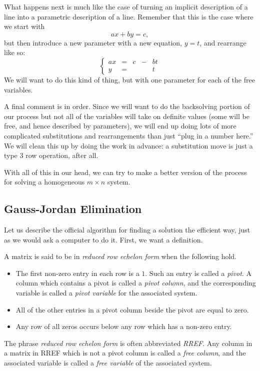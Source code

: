 \documentclass[elementsmain.tex]{subfiles}
\begin{document}
What happens next is much like the case of turning an implicit description of a line into a parametric description of a line. Remember that this is the case where we start with 
\[
ax+by=c,
\]
but then introduce a new parameter with a new equation, $y=t$, and rearrange like so:
\[
\left\{\begin{array}{rrrrr}
a x & = & c & - & b t \\
  y & = &   &   &   t
\end{array}\right.
\]
We will want to do this kind of thing, but with one parameter for each of the free variables.

A final comment is in order. Since we will want to do the backsolving portion of our process but not all of the variables will take on definite values (some will be free, and hence described by parameters), we will end up doing lots of more complicated substitutions and rearrangements than just ``plug in a number here.'' We will clean this up by doing the work in advance: a substitution move is just a type 3 row operation, after all. 

With all of this in our head, we can try to make a better version of the process for solving a homogeneous $m\times n$ system.


\subsection*{Gauss-Jordan Elimination}

Let us describe the official algorithm for finding a solution the efficient way, just as we would ask a computer to do it. First, we want a definition.

\begin{definition}
A matrix is said to be in \emph{reduced row echelon form} when the following hold.
\begin{itemize}
\item The first non-zero entry in each row is a $1$. Such an entry is called a \emph{pivot}. A column which contains a pivot is called a \emph{pivot column}, and the corresponding variable is called a \emph{pivot variable} for the associated system.
\item All of the other entries in a pivot column beside the pivot are equal to zero.
\item Any row of all zeros occurs below any row which has a non-zero entry.
\end{itemize}
The phrase \emph{reduced row echelon form} is often abbreviated \emph{RREF}. Any column in a matrix in RREF which is not a pivot column is called a \emph{free column}, and the associated variable is called a \emph{free variable} of the associated system.
\end{definition}
\end{document}
